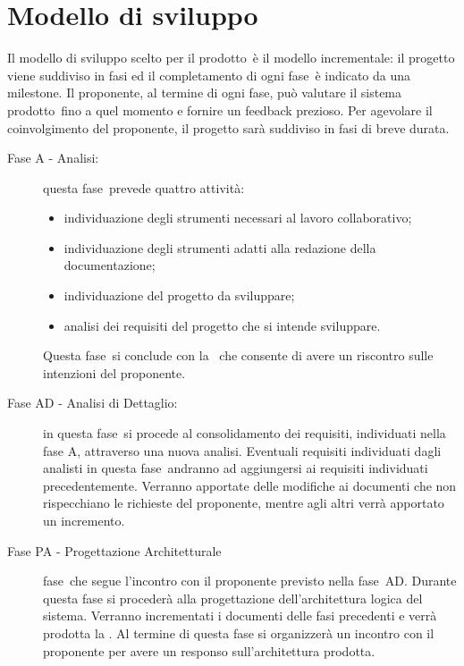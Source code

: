 \documentclass[../PianoProgetto.tex]{subfiles}
\begin{document}
\section{Modello di sviluppo}

	Il modello di sviluppo scelto per il prodotto\g\ è il modello incrementale\g : il progetto viene suddiviso in fasi ed il completamento di ogni fase\g\ è indicato da una milestone\g .
	Il proponente, al termine di ogni fase\g, può valutare il sistema prodotto\g\ fino a quel momento e fornire un feedback prezioso.
	Per agevolare il coinvolgimento del proponente, il progetto sarà suddiviso in fasi di breve durata.
	\begin{description}
	
	\item[Fase A - Analisi:] questa fase\g\ prevede quattro attività:
		\begin{itemize}
		\item individuazione degli strumenti necessari al lavoro collaborativo;
		\item individuazione degli strumenti adatti alla redazione della documentazione;
		\item individuazione del progetto da sviluppare;
		\item analisi dei requisiti del progetto che si intende sviluppare.
		\end{itemize}
		Questa fase\g\ si conclude con la \revisionedeirequisiti\ che consente di avere un riscontro sulle intenzioni del proponente.


	\item[Fase AD - Analisi di Dettaglio:]
	in questa fase\g\ si procede al consolidamento dei requisiti, individuati nella fase A, attraverso una nuova analisi.
	Eventuali requisiti individuati dagli analisti in questa fase\g\ andranno ad aggiungersi ai requisiti individuati precedentemente. 
	Verranno apportate delle modifiche ai documenti che non rispecchiano le richieste del proponente, mentre agli altri verrà apportato un incremento.

	\item[Fase PA - Progettazione Architetturale]
		fase\g\ che segue l'incontro con il proponente previsto nella fase\g\ AD. Durante questa fase si procederà alla progettazione dell'architettura logica del sistema. Verranno incrementati i documenti delle fasi precedenti e verrà prodotta la \specificatecnica . Al termine di questa fase si organizzerà un incontro con il proponente per avere un responso sull'architettura prodotta.


\end{description}
\end{document}
